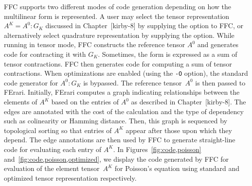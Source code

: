 FFC supports two different modes of code generation depending on how
the multilinear form is represented. A user may select the tensor
representation $A^K = A^0 : G_K$ discussed in Chapter~[kirby-8] by
supplying the  option to FFC, or alternatively select
quadrature representation by supplying the  option.
While running in tensor mode, FFC constructs the reference tensor \(
A^0 \) and generates code for contracting it with $G_K$. Sometimes,
the form is expressed as a sum of tensor contractions. FFC then
generates code for computing a sum of tensor contractions.  When
optimizations are enabled (using the \texttt{-O} option), the standard
code generator for \( A^0 : G_K \) is bypassed. The reference
tensor~\( A^0 \) is then passed to FErari. Initially, FErari computes
a graph indicating relationships between the elements of \( A^K \)
based on the entries of $A^0$ as described in Chapter~[kirby-8]. The
edges are annotated with the cost of the calculation and the type of
dependency such as colinearity or Hamming distance. Then, this graph
is sequenced by topological sorting so that entries of \( A^K \)
appear after those upon which they depend. The edge annotations are
then used by FFC to generate straight-line code for evaluating each
entry of \( A^K \). In Figures~\ref{fig:code,poisson}
and~\ref{fig:code,poisson,optimized}, we display the code generated by
FFC for evaluation of the element tensor~$A^K$ for Poisson's equation
using standard and optimized tensor representation respectively.

